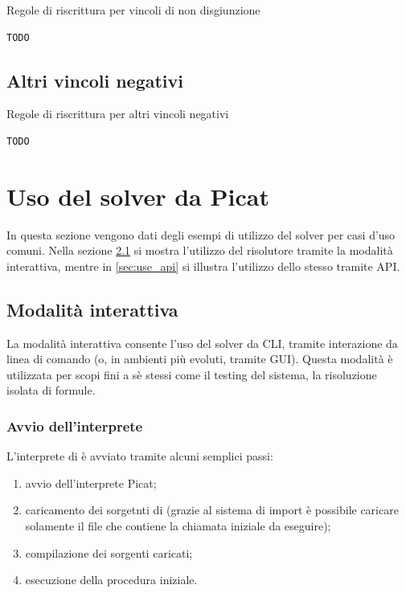 \documentclass[12pt,a4paper,openright]{book} %
\begin{document}
\begin{algorithm}[H]
	\caption{Regole di riscrittura per vincoli di non disgiunzione}
	\label{alg:notdisj_constraints}
\end{algorithm}
\begin{verbatim}
TODO
\end{verbatim}

\section{Altri vincoli negativi}

\begin{algorithm}[H]
	\caption{Regole di riscrittura per altri vincoli negativi}
	\label{alg:othernegatives_constraints}
\end{algorithm}
\begin{verbatim}
TODO
\end{verbatim}


\chapter{Uso del solver \lset{} da Picat}
\label{ch:use}

In questa sezione vengono dati degli esempi di utilizzo del solver per
casi d'uso comuni. Nella sezione \ref{sec:use_interactive} si mostra
l'utilizzo del risolutore tramite la modalità interattiva, mentre in
\ref{sec:use_api} si illustra l'utilizzo dello stesso tramite API.

\section{Modalità interattiva}
\label{sec:use_interactive}

La modalità interattiva consente l'uso del solver da CLI, tramite
interazione da linea di comando (o, in ambienti più evoluti, tramite
GUI). Questa modalità è utilizzata per scopi fini a sè stessi come il
testing del sistema, la risoluzione isolata di formule.

\subsection{Avvio dell'interprete}

L'interprete di \lset{} è avviato tramite alcuni semplici passi:
\begin{enumerate}
	\item avvio dell'interprete Picat;
	\item caricamento dei sorgetnti di \lset{} (grazie al sistema
          di import è possibile caricare solamente il file che
          contiene la chiamata iniziale da eseguire);
	\item compilazione dei sorgenti caricati;
	\item esecuzione della procedura iniziale.
\end{enumerate}
\end{document}
